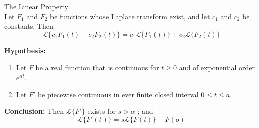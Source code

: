 \documentclass[12pt]{article}
\newcommand{\Lap}{\mathscr{L}}
\begin{document}
\begin{theorem}{The Linear Property}{}
    \\Let $F_1$ and $F_2$ be functions whose Laplace transform exist, and let $c_1$ and $c_2$ be constants. Then
    \[
        \Lap \{ c_1F_1(t) + c_2F_2(t) \} = c_1 \Lap \{ F_1(t) \} + c_2 \Lap \{ F_2(t) \}
    \]
\end{theorem}

\begin{theorem}{}{}
    \textbf{Hypothesis: }
    \begin{enumerate}
        \item Let $F$ be a real function that is continuous for $t \ge 0$ and of exponential order $e^{\alpha t}$.
        \item Let $F'$ be piecewise continuous in ever finite closed interval $0 \le t \le a$.
    \end{enumerate}

    \textbf{Conclusion: } Then $\Lap \{ F' \}$ exists for $s>\alpha$ ; and
    \[
        \Lap \{ F'(t) \} = s \Lap \{ F(t) \} - F(o)
    \]
\end{theorem}
\end{document}
